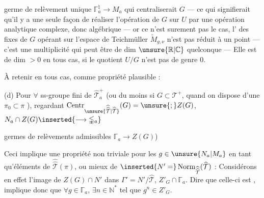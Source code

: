 
germe de relèvement unique $\mathbb{\Gamma}_a^{\natural}\longrightarrow M_a$ qui centraliserait $G$ --- ce qui signifierait qu'il y a  une seule façon de réaliser l'opération  de $G$ sur $U$ par une opération  analytique complexe, donc algébrique --- or ce n'est surement pas le cas, l' des  fixes de $G$ opérant sur l'espace de Teichmüller $\widetilde M_{g,\nu}$ n'est pas réduit à un point --- c'est  une multiplicité  qui peut être  de dim $\unsure{\mathbb R|\mathbb C}$ quelconque --- Elle est de dim $>0$ en tous cas, si le quotient  $U/G$ n'est pas de genre $0$.

À retenir en tous cas, comme propriété plausible :

(d) Pour $\forall$ ss-groupe fini  de $\widehat{\mathcal T}_a^+$ (ou du moins si $G\subset\mathcal T^+$, quand on dispose d'une  $\pi_0\subset\pi$ ), regardant $\operatorname{Centr}_{\unsure{\widehat{\widehat{\mathcal T}}|\widehat{\mathcal T}}}(G)=\unsure{;}Z(G)$, $N_a\cap Z(G)\inserted{\longrightarrow\mathbb{\Gamma}_a}$  


germes de relèvements admissibles $\mathbb{\Gamma}_a\to Z(G)$)

Ceci implique une propriété non triviale pour
les $g\in\unsure{N_a|M_a}$  en tant qu'éléments de $\widehat{\widehat{\mathcal T}}(\pi)$,
ou mieux de $\inserted{N'=}\operatorname{Norm}_{\widehat{\widehat{\mathcal T}}}(\widehat{\mathcal T})$ :
Considérons en effet l'image  de
$Z(G)\cap N'$ dans $\Gamma'=N'/\widehat{\mathcal T}$, 
$Z'_G\cap\mathbb{\Gamma}_a$. Dire que celle-ci est  ,
implique donc que $\forall g\in\mathbb{\Gamma}_a$,  $\exists n\in\mathbb N^{*}$
tel que $g^n\in Z'_G$. 

